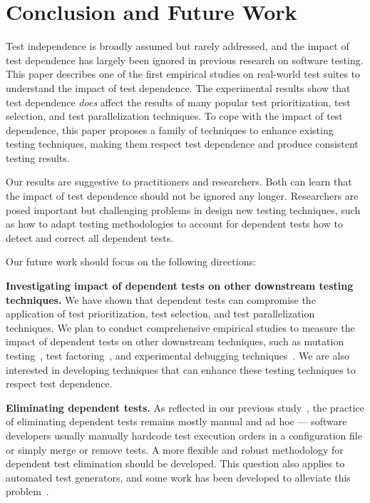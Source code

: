 \section{Conclusion and Future Work}

Test independence is broadly assumed but rarely addressed, and
the impact of test dependence has largely been ignored in previous research
on software testing. This paper describes
one of the first empirical studies on real-world test suites to
understand the impact of test dependence. The experimental
results show that test dependence \textit{does} affect the results
of many popular test prioritization, test selection, and test
parallelization techniques. To cope with the impact of test
dependence, this paper proposes a family of techniques
to enhance existing testing techniques, making them respect test dependence
and produce consistent testing results.


Our results are suggestive to practitioners and researchers.
Both can learn that the impact of test dependence 
should not be ignored any longer. Researchers are posed important
but challenging problems in design new testing techniques,
such as how to adapt testing methodologies to account for
dependent tests how to detect and correct all dependent tests.

Our future work should focus on the following directions:

\vspace{1mm}

\noindent \textbf{{Investigating impact of dependent tests
on other downstream testing techniques.}}
We have shown that dependent tests can compromise the application of
\prionum test prioritization, \selnum test selection,
and \parnum test parallelization techniques.
We plan to conduct comprehensive empirical studies to
measure the impact of dependent tests on other
downstream techniques, such as mutation testing~\cite{Zhang:2012:RMT, Schuler:2009:EMT, Zhang:2013:FMT},
test factoring~\cite{Saff:2005, Wu:2010:LRV}, and experimental
debugging techniques~\cite{Zeller:2002, Steimann:2013, Zhang:2013:IMF}.
We are also interested in developing techniques that can enhance these
testing techniques to respect test dependence.



\vspace{1mm}

\noindent \textbf{{Eliminating dependent tests.}}
As reflected in our previous study~\cite{},
the practice of eliminating dependent tests
remains mostly manual and ad hoc --- software developers
usually manually hardcode test
execution orders in a configuration file or
simply merge or remove tests.
A more flexible and robust methodology for
dependent test elimination should be developed.
This question also applies to automated test generators,
and some work has been developed to alleviate
this problem~\cite{vmvm, RobinsonEPAL2011,fraseretal:ISSTA:2011}.




